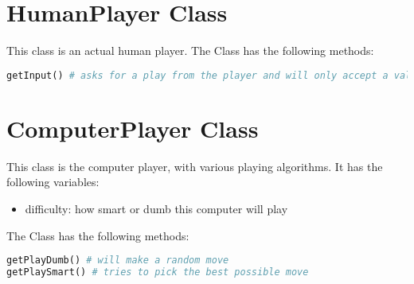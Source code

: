 \documentclass[12pt]{article}
\begin{document}
\pagebreak

\section{HumanPlayer Class}


This class is an actual human player. The Class has the following methods:
\begin{lstlisting}[language=Python]
getInput() # asks for a play from the player and will only accept a valid response. Will ask again if necessary. 
\end{lstlisting}

\section{ComputerPlayer Class}

This class is the computer player, with various playing algorithms. It has the following variables:
\begin{itemize}
  \item difficulty: how smart or dumb this computer will play
\end{itemize}

The Class has the following methods:
\begin{lstlisting}[language=Python]
getPlayDumb() # will make a random move
getPlaySmart() # tries to pick the best possible move
\end{lstlisting}
\end{document}
